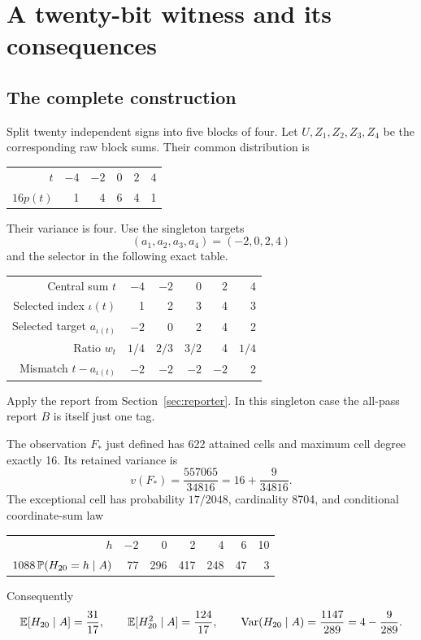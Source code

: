 \section{A twenty-bit witness and its consequences}
\label{sec:witness}

\subsection{The complete construction}

Split twenty independent signs into five blocks of four. Let
\(U,Z_1,Z_2,Z_3,Z_4\) be the corresponding raw block sums. Their
common distribution is
\begin{center}
\begin{tabular}{@{}rrrrrr@{}}
\toprule
\(t\)&\(-4\)&\(-2\)&\(0\)&\(2\)&\(4\)\\
\(16p(t)\)&1&4&6&4&1\\
\bottomrule
\end{tabular}
\end{center}
Their variance is four. Use the singleton targets
\[
 (a_1,a_2,a_3,a_4)=(-2,0,2,4)
\]
and the selector in the following exact table.
\begin{center}
\begin{tabular}{@{}rrrrrr@{}}
\toprule
Central sum \(t\)&\(-4\)&\(-2\)&\(0\)&\(2\)&\(4\)\\
Selected index \(\iota(t)\)&1&2&3&4&3\\
Selected target \(a_{\iota(t)}\)&\(-2\)&0&2&4&2\\
Ratio \(w_t\)&\(1/4\)&\(2/3\)&\(3/2\)&4&\(1/4\)\\
Mismatch \(t-a_{\iota(t)}\)&\(-2\)&\(-2\)&\(-2\)&\(-2\)&2\\
\bottomrule
\end{tabular}
\end{center}
Apply the report from Section~\ref{sec:reporter}. In this singleton
case the all-pass report \(B\) is itself just one tag.

\begin{theorem}\label{thm:witness}
The observation \(F_*\) just defined has 622 attained cells and
maximum cell degree exactly 16. Its retained variance is
\[
 v(F_*)=\frac{557065}{34816}
       =16+\frac9{34816}.
\]
The exceptional cell has probability \(17/2048\), cardinality 8704,
and conditional coordinate-sum law
\begin{center}
\begin{tabular}{@{}rrrrrrr@{}}
\toprule
\(h\)&\(-2\)&0&2&4&6&10\\
\(1088\,\mathbb P(H_{20}=h\mid A)\)&77&296&417&248&47&3\\
\bottomrule
\end{tabular}
\end{center}
Consequently
\[
 \mathbb E[H_{20}\mid A]=\frac{31}{17},\qquad
 \mathbb E[H_{20}^2\mid A]=\frac{124}{17},\qquad
 \operatorname{Var}(H_{20}\mid A)=\frac{1147}{289}=4-\frac9{289}.
\]
\end{theorem}

